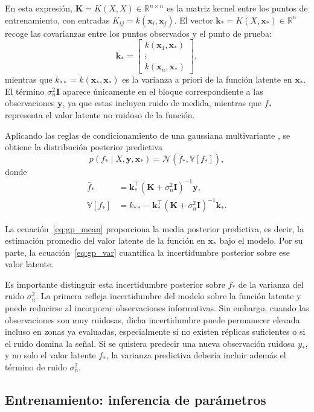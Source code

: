 En esta expresión, \(\bm{K}=K(X,X)\in\mathbb{R}^{n\times n}\) es la matriz kernel entre los
puntos de entrenamiento, con entradas
\(
K_{ij}=k(\bm{x}_i,\bm{x}_j).
\)
El vector \(\bm{k}_*=K(X,\bm{x}_*)\in\mathbb{R}^n\) recoge las covarianzas entre los puntos
observados y el punto de prueba:
\[
\bm{k}_*
=
\begin{bmatrix}
k(\bm{x}_1,\bm{x}_*) \\
\vdots \\
k(\bm{x}_n,\bm{x}_*)
\end{bmatrix},
\]
mientras que
\(
k_{**}=k(\bm{x}_*,\bm{x}_*)
\)
es la varianza a priori de la función latente en \(\bm{x}_*\). El término
\(\sigma_n^2\bm{I}\) aparece únicamente en el bloque correspondiente a las observaciones
\(\bm{y}\), ya que estas incluyen ruido de medida, mientras que \(f_*\) representa el valor
latente no ruidoso de la función.

Aplicando las reglas de condicionamiento de una gaussiana multivariante
\cite{rasmussen2006gpml}, se obtiene la distribución posterior predictiva
\[
p(f_*\mid X,\bm{y},\bm{x}_*)
=
\mathcal{N}(\bar{f}_*,\mathbb{V}[f_*]),
\]
donde
\begin{align}
\bar{f}_*
&=
\bm{k}_*^\top
(\bm{K}+\sigma_n^2\bm{I})^{-1}
\bm{y},
\label{eq:gp_mean}
\\
\mathbb{V}[f_*]
&=
k_{**}
-
\bm{k}_*^\top
(\bm{K}+\sigma_n^2\bm{I})^{-1}
\bm{k}_*.
\label{eq:gp_var}
\end{align}

La ecuación~\eqref{eq:gp_mean} proporciona la media posterior predictiva, es decir, la
estimación promedio del valor latente de la función en \(\bm{x}_*\) bajo el modelo. Por su
parte, la ecuación~\eqref{eq:gp_var} cuantifica la incertidumbre posterior sobre ese valor
latente.

Es importante distinguir esta incertidumbre posterior sobre \(f_*\) de la varianza del ruido
\(\sigma_n^2\). La primera refleja incertidumbre del modelo sobre la función
latente y puede reducirse al incorporar observaciones informativas. Sin embargo, cuando las
observaciones son muy ruidosas, dicha incertidumbre puede permanecer elevada incluso en
zonas ya evaluadas, especialmente si no existen réplicas suficientes o si el ruido domina la
señal. Si se quisiera predecir una nueva observación ruidosa \(y_*\), y no solo el valor
latente \(f_*\), la varianza predictiva debería incluir además el término de ruido
\(\sigma_n^2\).
\subsection{Entrenamiento: inferencia de parámetros}

